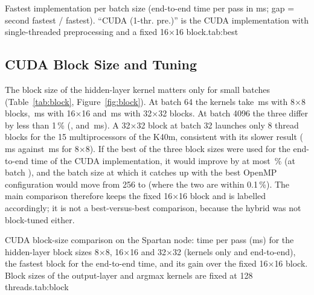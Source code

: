 \begin{coltable}{Fastest implementation per batch size (end-to-end time per pass in ms; gap = second fastest / fastest). ``CUDA (1-thr. pre.)'' is the CUDA implementation with single-threaded preprocessing and a fixed 16$\times$16 block.}{tab:best}
\fitcol{}
\end{coltable}

\subsection{CUDA Block Size and Tuning}\label{sec:block}

The block size of the hidden-layer kernel matters only for small batches (Table~\ref{tab:block}, Figure~\ref{fig:block}). At batch 64 the kernels take \,ms with 8$\times$8 blocks, \,ms with 16$\times$16 and \,ms with 32$\times$32 blocks. At batch 4096 the three differ by less than 1\,\% (,  and \,ms). A 32$\times$32 block at batch 32 launches only 8 thread blocks for the 15 multiprocessors of the K40m, consistent with its slower result (\,ms against \,ms for 8$\times$8). If the best of the three block sizes were used for the end-to-end time of the CUDA implementation, it would improve by at most \,\% (at batch ), and the batch size at which it catches up with the best OpenMP configuration would move from 256 to  (where the two are within 0.1\,\%). The main comparison therefore keeps the fixed 16$\times$16 block and is labelled accordingly; it is not a best-versus-best comparison, because the hybrid was not block-tuned either.

\begin{widetable}{CUDA block-size comparison on the Spartan node: time per pass (ms) for the hidden-layer block sizes 8$\times$8, 16$\times$16 and 32$\times$32 (kernels only and end-to-end), the fastest block for the end-to-end time, and its gain over the fixed 16$\times$16 block. Block sizes of the output-layer and argmax kernels are fixed at 128 threads.}{tab:block}

\end{widetable}


